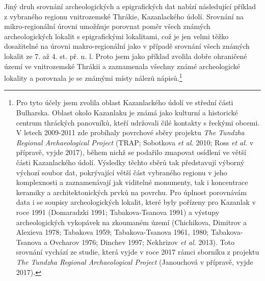 Jiný druh srovnání archeologických a epigrafických dat nabízí následující příklad z vybraného regionu vnitrozemské Thrákie, Kazanlackého údolí. Srovnání na mikro-regionální úrovni umožňuje porovnat poměr všech známých archeologických lokalit s epigrafickými lokalitami, což je jen velmi těžko dosažitelné na úrovni makro-regionální jako v případě srovnání všech známých lokalit ze 7. až 4. st. př. n. l. Proto jsem jako příklad zvolila dobře ohraničené území ve vnitrozemské Thrákii a zaznamenala všechny známé archeologické lokality a porovnala je se známými místy nálezů nápisů.\footnote{Pro tyto účely jsem zvolila oblast Kazanlackého údolí ve střední části Bulharska. Oblast okolo Kazanlaku je známá jako kulturní a historické centrum thráckých panovníků, kteří udržovali čilé kontakty s řeckými obcemi. V letech 2009-2011 zde probíhaly povrchové sběry projektu {\em The Tundzha Regional Archaeological Project} (TRAP; Sobotkova {\em et al.} 2010; Ross {\em et al.} v přípravě, vyjde 2017), během nichž se podařilo zmapovat osídlení ve větší části Kazanlackého údolí. Výsledky těchto sběrů tak představují výborný výchozí soubor dat, pokrývající větší část vybraného regionu v jeho komplexnosti a zaznamenávají jak viditelné monumenty, tak i koncentrace keramiky a architektonických prvků na povrchu. Pro úplnost porovnávám data i se soupisy archeologických lokalit, které byly pořízeny pro Kazanlak v roce 1991 (Domaradzki 1991; Tabakova-Tsanova 1991) a výstupy archeologických vykopávek na zkoumaném území (Chichikova, Dimitrov a Alexieva 1978; Tabakova 1959; Tabakova-Tsanova 1961, 1980; Tabakova-Tsanova a Ovcharov 1976; Dinchev 1997; Nekhrizov {\em et al.} 2013). Toto srovnání vychází ze studie, která vyjde v roce 2017 rámci sborníku z projektu {\em The Tundzha Regional Archaeological Project} (Janouchová v přípravě, vyjde 2017).}

